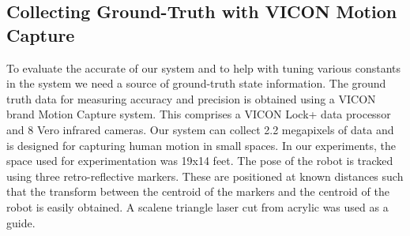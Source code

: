 \documentclass{article}
\begin{document}


  \subsection{Collecting Ground-Truth with VICON Motion Capture}

    To evaluate the accurate of our system and to help with tuning various constants in the system we need a source of ground-truth state information. The ground truth data for measuring accuracy and precision is obtained using a VICON brand Motion Capture system. This comprises a VICON Lock+ data processor and 8 Vero infrared cameras. Our system can collect 2.2 megapixels of data and is designed for capturing human motion in small spaces. In our experiments, the space used for experimentation was 19x14 feet. The pose of the robot is tracked using three retro-reflective markers. These are positioned at known distances such that the transform between the centroid of the markers and the centroid of the robot is easily obtained. A scalene triangle laser cut from acrylic was used as a guide.
\end{document}
